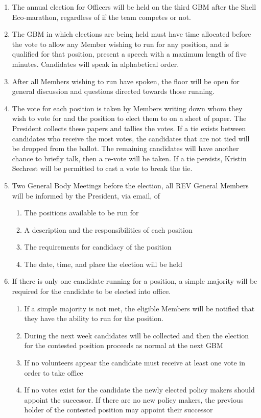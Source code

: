 \begin{enumerate}
\item The annual election for Officers will be held on the third GBM after the Shell Eco-marathon, regardless of if the team competes or not.
\item The GBM in which elections are being held must have time allocated before the vote to allow any Member wishing to run for any position, and is qualified for that position, present a speech with a maximum length of five minutes. Candidates will speak in alphabetical order.
\item After all Members wishing to run have spoken, the floor will be open for general discussion and questions directed towards those running.
\item The vote for each position is taken by Members writing down whom they wish to vote for and the position to elect them to on a sheet of paper. The President collects these papers and tallies the votes. If a tie exists between candidates who receive the most votes, the candidates that are not tied will be dropped from the ballot. The remaining candidates will have another chance to briefly talk, then a re-vote will be taken. If a tie persists, Kristin Sechrest will be permitted to cast a vote to break the tie.
\item Two General Body Meetings before the election, all REV General Members will be informed by the President, via email, of
    \begin{enumerate}
    \item The positions available to be run for
    \item A description and the responsibilities of each position
    \item The requirements for candidacy of the position
    \item The date, time, and place the election will be held
    \end{enumerate}
\item If there is only one candidate running for a position, a simple majority will be required for the candidate to be elected into office.
    \begin{enumerate}
    \item  If a simple majority is not met, the eligible Members will be notified that they have the ability to run for the position.
    \item During the next week candidates will be collected and then the election for the contested position proceeds as normal at the next GBM
    \item If no volunteers appear the candidate must receive at least one vote in order to take office
    \item If no votes exist for the candidate the newly elected policy makers should appoint the successor. If there are no new policy makers, the previous holder of the contested position may appoint their successor
    \end{enumerate}
\end{enumerate}

